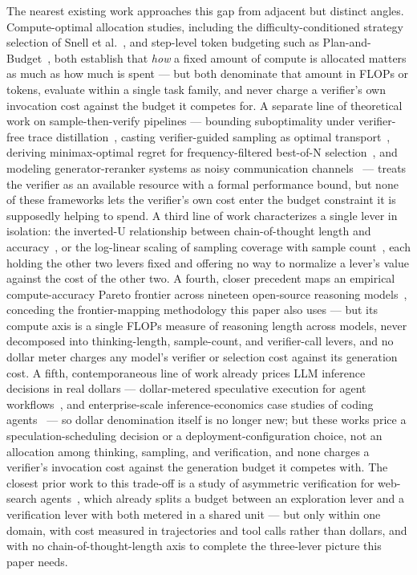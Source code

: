 \documentclass[11pt]{article}
\begin{document}
The nearest existing work approaches this gap from adjacent but distinct angles. Compute-optimal allocation studies, including the difficulty-conditioned strategy selection of Snell et al.~\citep{SnellTTC4FWA}, and step-level token budgeting such as Plan-and-Budget~\citep{PlanBudgctsp}, both establish that \emph{how} a fixed amount of compute is allocated matters as much as how much is spent --- but both denominate that amount in FLOPs or tokens, evaluate within a single task family, and never charge a verifier's own invocation cost against the budget it competes for. A separate line of theoretical work on sample-then-verify pipelines --- bounding suboptimality under verifier-free trace distillation~\citep{VerifierFreeSubbeee}, casting verifier-guided sampling as optimal transport~\citep{OTVerifyBBDh}, deriving minimax-optimal regret for frequency-filtered best-of-N selection~\citep{BestOfMaja6CV}, and modeling generator-reranker systems as noisy communication channels~\citep{RerankLawsrhCg} --- treats the verifier as an available resource with a formal performance bound, but none of these frameworks lets the verifier's own cost enter the budget constraint it is supposedly helping to spend. A third line of work characterizes a single lever in isolation: the inverted-U relationship between chain-of-thought length and accuracy~\citep{CoTLength6QDF}, or the log-linear scaling of sampling coverage with sample count~\citep{BrownMonkeys240721787}, each holding the other two levers fixed and offering no way to normalize a lever's value against the cost of the other two. A fourth, closer precedent maps an empirical compute-accuracy Pareto frontier across nineteen open-source reasoning models~\citep{ComputeAccuracy251224776}, conceding the frontier-mapping methodology this paper also uses --- but its compute axis is a single FLOPs measure of reasoning length across models, never decomposed into thinking-length, sample-count, and verifier-call levers, and no dollar meter charges any model's verifier or selection cost against its generation cost. A fifth, contemporaneous line of work already prices LLM inference decisions in real dollars --- dollar-metered speculative execution for agent workflows~\citep{SpecExec260607846}, and enterprise-scale inference-economics case studies of coding agents~\citep{InferEcon260713080} --- so dollar denomination itself is no longer new; but these works price a speculation-scheduling decision or a deployment-configuration choice, not an allocation among thinking, sampling, and verification, and none charges a verifier's invocation cost against the generation budget it competes with. The closest prior work to this trade-off is a study of asymmetric verification for web-search agents~\citep{AsymVerifhxL4}, which already splits a budget between an exploration lever and a verification lever with both metered in a shared unit --- but only within one domain, with cost measured in trajectories and tool calls rather than dollars, and with no chain-of-thought-length axis to complete the three-lever picture this paper needs.
\end{document}
